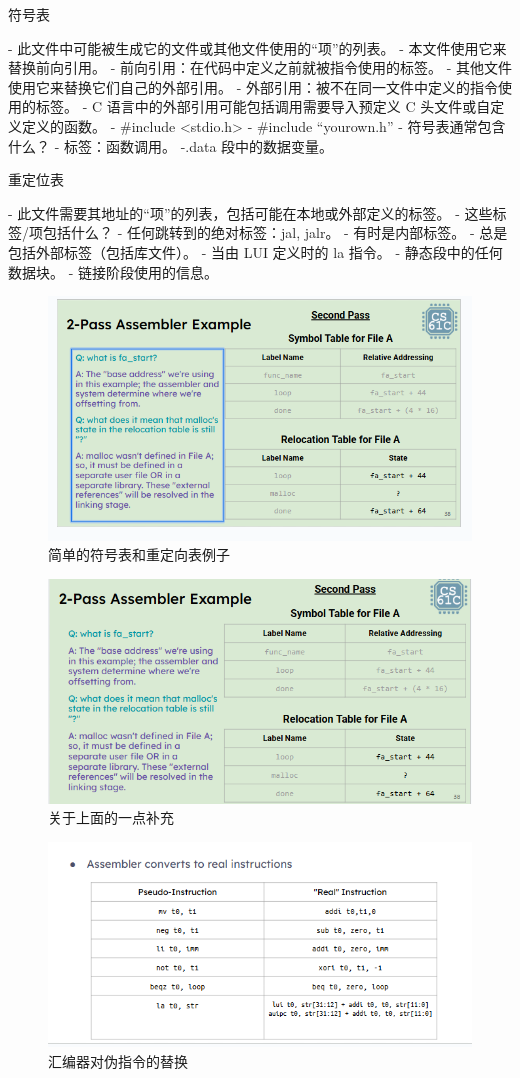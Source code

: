 \documentclass{ctexart}
\begin{document}
\par
符号表  \par
- 此文件中可能被生成它的文件或其他文件使用的“项”的列表。  
- 本文件使用它来替换前向引用。  
  - 前向引用：在代码中定义之前就被指令使用的标签。  
- 其他文件使用它来替换它们自己的外部引用。  
  - 外部引用：被不在同一文件中定义的指令使用的标签。  
  - C 语言中的外部引用可能包括调用需要导入预定义 C 头文件或自定义定义的函数。  
    - #include <stdio.h>  
    - #include “yourown.h”  
- 符号表通常包含什么？  
  - 标签：函数调用。  
  -.data 段中的数据变量。  
\par
重定位表  \par
- 此文件需要其地址的“项”的列表，包括可能在本地或外部定义的标签。  
- 这些标签/项包括什么？  
  - 任何跳转到的绝对标签：jal, jalr。  
  - 有时是内部标签。  
  - 总是包括外部标签（包括库文件）。  
  - 当由 LUI 定义时的 la 指令。  
  - 静态段中的任何数据块。  
- 链接阶段使用的信息。 
\begin{figure}
    \centering
    \includegraphics[width=0.5\linewidth]{简单的符号表和重定向表例子.png}
    \caption{简单的符号表和重定向表例子}
    \label{fig:enter-label}
\end{figure}
\begin{figure}
    \centering
    \includegraphics[width=0.5\linewidth]{关于上面的一点补充.png}
    \caption{关于上面的一点补充}
    \label{fig:enter-label}
\end{figure}
\begin{figure}
    \centering
    \includegraphics[width=0.5\linewidth]{汇编器对伪指令的替换.png}
    \caption{ 汇编器对伪指令的替换  }
    \label{fig:enter-label}
\end{figure}
\end{document}
